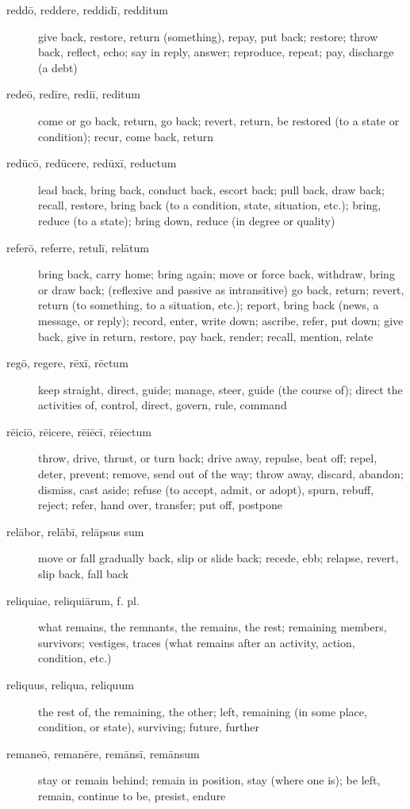 \begin{description}
    \item[reddō, reddere, reddidī, redditum] \marginnote{*}give back, restore, return (something), repay, put back; restore; throw back, reflect, echo; say in reply, answer; reproduce, repeat; pay, discharge (a debt)
    \item[redeō, redīre, rediī, reditum] \marginnote{*}come or go back, return, go back; revert, return, be restored (to a state or condition); recur, come back, return
    \item[redūcō, redūcere, redūxī, reductum] lead back, bring back,  conduct back, escort back; pull back, draw back; recall, restore, bring back (to a condition, state, situation, etc.); bring, reduce (to a state); bring down, reduce (in degree or quality)
    \item[referō, referre, retulī, relātum] \marginnote{*}bring back, carry home; bring again; move or force back, withdraw, bring or draw back; (reflexive and passive as intransitive) go back, return; revert, return (to something, to a situation, etc.); report, bring back (news, a message, or reply); record, enter, write down; ascribe, refer, put down; give back, give in return, restore, pay back, render; recall, mention, relate
    \item[regō, regere, rēxī, rēctum] \marginnote{*}keep straight, direct, guide; manage, steer, guide (the course of); direct the activities of, control, direct, govern, rule, command
    \item[rēiciō, rēicere, rēiēcī, rēiectum] throw, drive, thrust, or turn back; drive away, repulse, beat off; repel, deter, prevent; remove, send out of the way; throw away, discard, abandon; dismiss, cast aside; refuse (to accept, admit, or adopt), spurn, rebuff, reject; refer, hand over, transfer; put off, postpone
    \item[relābor, relābī, relāpsus sum] move or fall gradually back, slip or slide back; recede, ebb; relapse, revert, slip back, fall back
    \item[reliquiae, reliquiārum, f. pl.] what remains, the remnants, the remains, the rest; remaining members, survivors; vestiges, traces (what remains after an activity, action, condition, etc.)
    \item[reliquus, reliqua, reliquum] \marginnote{*}the rest of, the remaining, the other; left, remaining (in some place, condition, or state), surviving; future, further
    \item[remaneō, remanēre, remānsī, remānsum] stay or remain behind; remain in position, stay (where one is); be left, remain, continue to be, presist, endure

\end{description}

